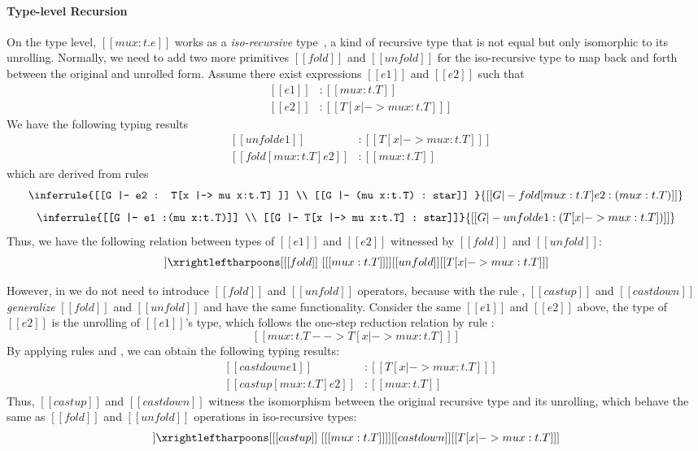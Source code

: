 \paragraph{Type-level Recursion}

On the type level, $[[mu x:t.e]]$ works as a \emph{iso-recursive}
type~\cite{eqi:iso}, a kind of recursive type that is not equal but only isomorphic
to its unrolling. Normally, we need to add two more primitives
$[[fold]]$ and $[[unfold]]$ for the iso-recursive type to map back
and forth between the original and unrolled form. Assume there exist
expressions $[[e1]]$ and $[[e2]]$ such that
\[\begin{array}{lll}
  &[[e1]] &: [[mu x:t.T]]\\
  &[[e2]] &: [[T [x |-> mu x:t.T] ]]
\end{array}\]
We have the following typing results
\[\begin{array}{lll}
  &[[unfold e1]] &: [[T [x |-> mu x:t.T] ]]\\
  &[[fold [mu x:t.T] e2]] &: [[mu x:t.T]]
\end{array}\]
which are derived from rules~\cite{tapl}
\[ \inferrule{[[G |- e2 : T[x |-> mu x:t.T] ]] \\ [[G |- (mu x:t.T) : star]] }
   {[[G |- fold [mu x:t.T] e2 : (mu x:t.T) ]]} \]
\[ \inferrule{[[G |- e1 :(mu x:t.T)]] \\ [[G |- T[x |-> mu x:t.T] : star]]}
   {[[G |- unfold e1 : (T[x |-> mu x:t.T]) ]]} \]
Thus, we have the following relation between types of $[[e1]]$ and $[[e2]]$
witnessed by $[[fold]]$ and $[[unfold]]$:
\begin{align*}
  [[mu x:t.T]] \xrightleftharpoons[{[[fold]]~[ [[mu x:t.T]] ]}]
  {[[unfold]]} [[T[x |-> mu x:t.T] ]]
\end{align*}

However, in \name we do not need to introduce $[[fold]]$ and
$[[unfold]]$ operators, because with the rule ,
$[[castup]]$ and $[[castdown]]$ \emph{generalize} $[[fold]]$ and
$[[unfold]]$ and have the same functionality.
Consider the same $[[e1]]$ and $[[e2]]$ above, the type of
$[[e2]]$ is the unrolling of $[[e1]]$'s type, which follows the
one-step reduction relation by rule :
\[ [[mu x:t.T --> T [x |-> mu x:t.T] ]] \]
By applying rules  and , we
can obtain the following typing results:
\[\begin{array}{lll}
	&[[castdown e1]] &: [[T [x |-> mu x:t.T] ]]\\
	&[[castup [mu x:t.T] e2]] &: [[mu x:t.T]]
\end{array}\]
Thus, $[[castup]]$ and $[[castdown]]$ witness the isomorphism between
the original recursive type and its unrolling, which behave the same
as $[[fold]]$ and $[[unfold]]$ operations in iso-recursive types:
\begin{align*}
  [[mu x:t.T]] \xrightleftharpoons[{[[castup]]~[ [[mu x:t.T]]
  ]}]{[[castdown]]} [[T[x |-> mu x:t.T] ]]
\end{align*}


